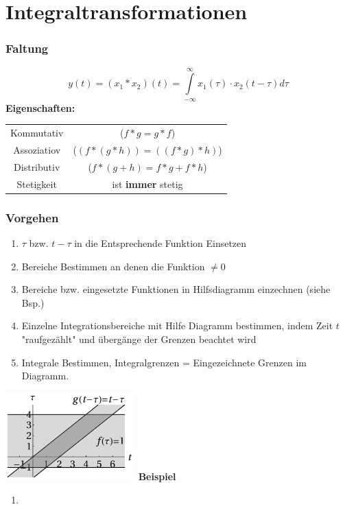 


\section{Integraltransformationen}

\subsubsection*{Faltung}
\begin{multicols*}{2}
  
  $$y(t) = (x_1 * x_2)(t) = \int \limits _{-\infty} ^{\infty} x_1(\tau) \cdot x_2(t-\tau) d\tau$$
  \textbf{Eigenschaften:} \\
  \begin{tabular}{cc}
    Kommutativ & ($f * g = g * f$)\\
    Assoziatiov &($(f*(g*h)) = ((f*g)*h)$)\\
    Distributiv &($f*(g+h)= f*g + f*h$)\\
    Stetigkeit & ist \textbf{immer} stetig
  \end{tabular}
  
\subsubsection*{Vorgehen}
\begin{enumerate}
  \item $\tau$ bzw. $t-\tau$ in die Entsprechende Funktion Einsetzen
  \item Bereiche Bestimmen an denen die Funktion $\neq 0$ 
  \item Bereiche bzw. eingesetzte Funktionen in Hilfsdiagramm einzechnen (siehe Bsp.)
  \item Einzelne Integrationsbereiche mit Hilfe Diagramm bestimmen,
  indem Zeit $t$ "raufgezählt" und übergänge der Grenzen beachtet wird
  \item Integrale Bestimmen, Integralgrenzen = Eingezeichnete Grenzen im Diagramm.
\end{enumerate}
\includegraphics[width = 5cm]{include/Integraltransformationen/img/Faltungsgrenzen.png}
\textbf{Beispiel} 
\begin{enumerate}
  \item 
\end{enumerate}

\end{multicols*}

